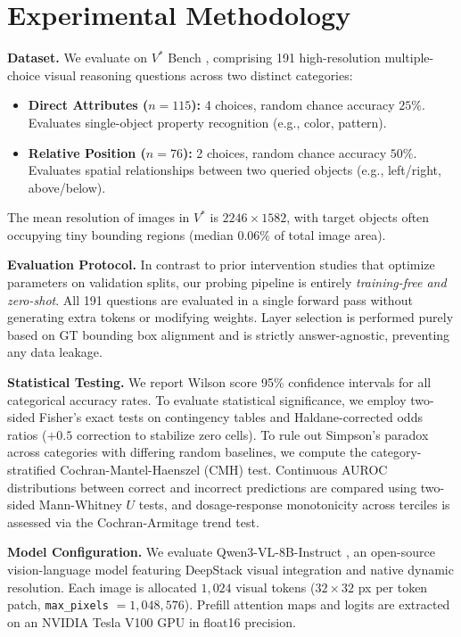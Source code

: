 \documentclass{article}
\begin{document}
\section{Experimental Methodology}

\textbf{Dataset.} We evaluate on $V^*$ Bench \citep{wu2024vstar}, comprising 191 high-resolution multiple-choice visual reasoning questions across two distinct categories:
\begin{itemize}
    \item \textbf{Direct Attributes ($n=115$):} 4 choices, random chance accuracy $25\%$. Evaluates single-object property recognition (e.g., color, pattern).
    \item \textbf{Relative Position ($n=76$):} 2 choices, random chance accuracy $50\%$. Evaluates spatial relationships between two queried objects (e.g., left/right, above/below).
\end{itemize}
The mean resolution of images in $V^*$ is $2246 \times 1582$, with target objects often occupying tiny bounding regions (median $0.06\%$ of total image area).

\textbf{Evaluation Protocol.} In contrast to prior intervention studies that optimize parameters on validation splits, our probing pipeline is entirely \textit{training-free and zero-shot}. All 191 questions are evaluated in a single forward pass without generating extra tokens or modifying weights. Layer selection is performed purely based on GT bounding box alignment and is strictly answer-agnostic, preventing any data leakage.

\textbf{Statistical Testing.} We report Wilson score 95\% confidence intervals for all categorical accuracy rates. To evaluate statistical significance, we employ two-sided Fisher's exact tests on contingency tables and Haldane-corrected odds ratios ($+0.5$ correction to stabilize zero cells). To rule out Simpson's paradox across categories with differing random baselines, we compute the category-stratified Cochran-Mantel-Haenszel (CMH) test. Continuous AUROC distributions between correct and incorrect predictions are compared using two-sided Mann-Whitney $U$ tests, and dosage-response monotonicity across terciles is assessed via the Cochran-Armitage trend test.

\textbf{Model Configuration.} We evaluate Qwen3-VL-8B-Instruct \citep{qwen2025qwen3vl}, an open-source vision-language model featuring DeepStack visual integration \citep{meng2024deepstack} and native dynamic resolution. Each image is allocated $1,024$ visual tokens ($32 \times 32$ px per token patch, \texttt{max\_pixels} $= 1,048,576$). Prefill attention maps and logits are extracted on an NVIDIA Tesla V100 GPU in float16 precision.
\end{document}
